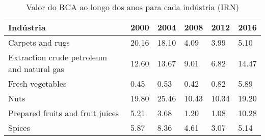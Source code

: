 \begin{table}
\centering
\caption{Valor do RCA ao longo dos anos para cada indústria (IRN)}
\label{tab:ex3-tempo-IRN}
\begin{tabular}{p{6cm}p{1.5cm}p{1.5cm}p{1.5cm}p{1.5cm}p{1.5cm}}
\toprule
                                 Indústria &  2000 &  2004 &  2008 &  2012 &  2016 \\
\midrule
                          Carpets and rugs & 20.16 & 18.10 &  4.09 &  3.99 &  5.10 \\
Extraction crude petroleum and natural gas & 12.60 & 13.67 &  9.01 &  6.82 & 14.47 \\
                          Fresh vegetables &  0.45 &  0.53 &  0.42 &  0.82 &  5.89 \\
                                      Nuts & 19.80 & 25.46 & 10.43 & 10.34 & 19.20 \\
          Prepared fruits and fruit juices &  5.21 &  3.68 &  1.20 &  1.08 & 10.28 \\
                                    Spices &  5.87 &  8.36 &  4.61 &  3.07 &  5.14 \\
\bottomrule
\end{tabular}
\end{table}
